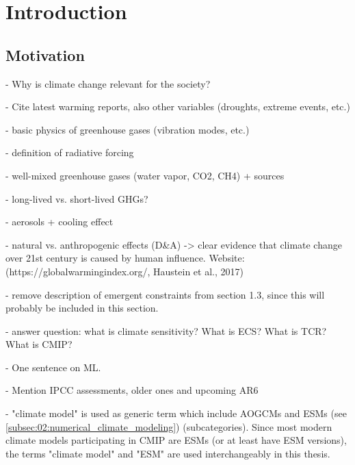 


\chapter{Introduction}
\label{ch:01:introduction}


\section{Motivation}
\label{sec:01:motivation}

- Why is climate change relevant for the society?

- Cite latest warming reports, also other variables (droughts, extreme events,
etc.)

- basic physics of greenhouse gases (vibration modes, etc.)

- definition of radiative forcing

- well-mixed greenhouse gases (water vapor, CO2, CH4) + sources

- long-lived vs. short-lived GHGs?

- aerosols + cooling effect

- natural vs. anthropogenic effects (D\&A) -> clear evidence that climate
change over 21st century is caused by human influence. Website:
(https://globalwarmingindex.org/, Haustein et al., 2017)

- remove description of emergent constraints from section 1.3, since this will
probably be included in this section.

- answer question: what is climate sensitivity? What is \ac{ECS}? What is
\ac{TCR}? What is \ac{CMIP}?

- One sentence on \ac{ML}.

- Mention IPCC assessments, older ones and upcoming AR6

- "climate model" is used as generic term which include \acp{AOGCM} and
\acp{ESM} (see \cref{subsec:02:numerical_climate_modeling}) (subcategories).
Since most modern climate models participating in CMIP are \acp{ESM} (or at
least have \ac{ESM} versions), the terms "climate model" and "ESM" are used
interchangeably in this thesis.



